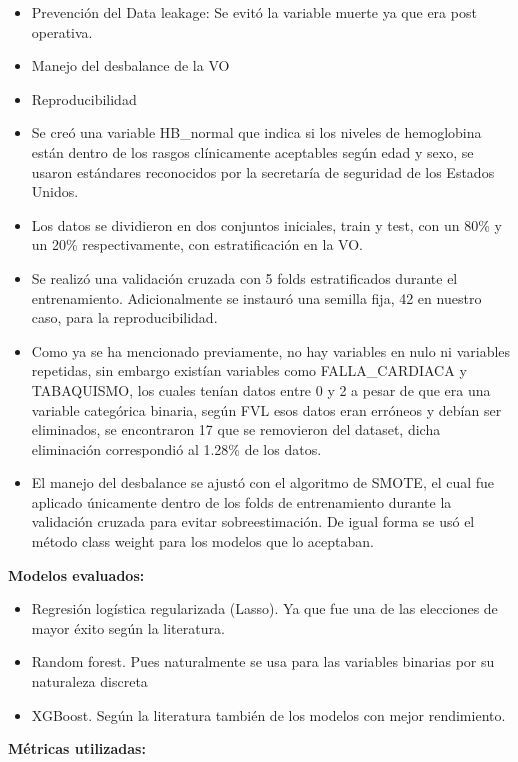 \documentclass[12pt, letterpaper]{article}
\begin{document}
\begin{itemize}
    \item Prevención del Data leakage: Se evitó la variable muerte ya que era post operativa.
    \item Manejo del desbalance de la VO
    \item Reproducibilidad
    \item Se creó una variable HB\_normal que indica si los niveles de hemoglobina están dentro de los rasgos clínicamente aceptables según edad y sexo, se usaron estándares reconocidos por la secretaría de seguridad de los Estados Unidos.
    \item Los datos se dividieron en dos conjuntos iniciales, train y test, con un 80\% y un 20\% respectivamente, con estratificación en la VO.
    \item Se realizó una validación cruzada con 5 folds estratificados durante el entrenamiento. Adicionalmente se instauró una semilla fija, 42 en nuestro caso, para la reproducibilidad.
    \item Como ya se ha mencionado previamente, no hay variables en nulo ni variables repetidas, sin embargo existían variables como FALLA\_CARDIACA y TABAQUISMO, los cuales tenían datos entre 0 y 2 a pesar de que era una variable categórica binaria, según FVL esos datos eran erróneos y debían ser eliminados, se encontraron 17 que se removieron del dataset, dicha eliminación correspondió al 1.28\% de los datos.
    \item El manejo del desbalance se ajustó con el algoritmo de SMOTE, el cual fue aplicado únicamente dentro de los folds de entrenamiento durante la validación cruzada para evitar sobreestimación. De igual forma se usó el método class weight para los modelos que lo aceptaban.
\end{itemize}

\textbf{Modelos evaluados:}

\begin{itemize}
    \item Regresión logística regularizada (Lasso). Ya que fue una de las elecciones de mayor éxito según la literatura.
    \item Random forest. Pues naturalmente se usa para las variables binarias por su naturaleza discreta
    \item XGBoost. Según la literatura también de los modelos con mejor rendimiento.
\end{itemize}

\textbf{Métricas utilizadas:}
\end{document}
